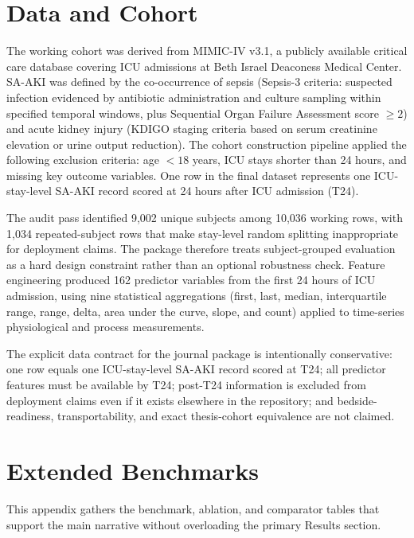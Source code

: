 \begin{appendices}

\section{Data and Cohort}\label{app:data}

The working cohort was derived from MIMIC-IV v3.1, a publicly available critical care database covering ICU admissions at Beth Israel Deaconess Medical Center.\cite{Johnson2023} SA-AKI was defined by the co-occurrence of sepsis (Sepsis-3 criteria: suspected infection evidenced by antibiotic administration and culture sampling within specified temporal windows, plus Sequential Organ Failure Assessment score $\geq 2$)\cite{Singer2016,Vincent1996} and acute kidney injury (KDIGO staging criteria based on serum creatinine elevation or urine output reduction).\cite{KDIGO2012} The cohort construction pipeline applied the following exclusion criteria: age $< 18$ years, ICU stays shorter than 24 hours, and missing key outcome variables. One row in the final dataset represents one ICU-stay-level SA-AKI record scored at 24 hours after ICU admission (T24).

The audit pass identified 9{,}002 unique subjects among 10{,}036 working rows, with 1{,}034 repeated-subject rows that make stay-level random splitting inappropriate for deployment claims. The package therefore treats subject-grouped evaluation as a hard design constraint rather than an optional robustness check. Feature engineering produced 162 predictor variables from the first 24 hours of ICU admission, using nine statistical aggregations (first, last, median, interquartile range, range, delta, area under the curve, slope, and count) applied to time-series physiological and process measurements.

The explicit data contract for the journal package is intentionally conservative: one row equals one ICU-stay-level SA-AKI record scored at T24; all predictor features must be available by T24; post-T24 information is excluded from deployment claims even if it exists elsewhere in the repository; and bedside-readiness, transportability, and exact thesis-cohort equivalence are not claimed.

\section{Extended Benchmarks}\label{app:benchmarks}

This appendix gathers the benchmark, ablation, and comparator tables that support the main narrative without overloading the primary Results section.


\end{appendices}
